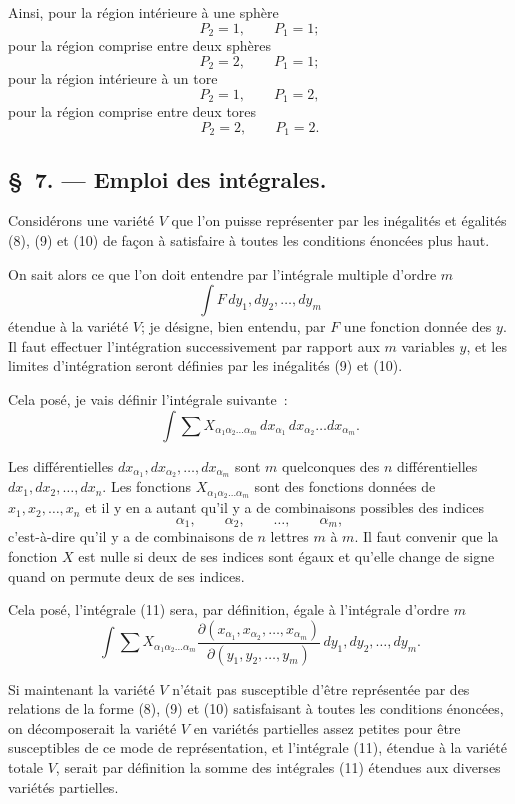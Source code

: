 \documentclass{article}
\begin{document}
Ainsi, pour la région intérieure à une sphère
\[
P_{2} = 1, \qquad P_{1} = 1;
\]
pour la région comprise entre deux sphères
\[
P_{2} = 2, \qquad P_{1} = 1;
\]
pour la région intérieure à un tore
\[
P_{2} = 1, \qquad P_{1} = 2,
\]
pour la région comprise entre deux tores
\[
P_{2} = 2, \qquad P_{1} = 2.
\]

\subsection*{\S~7. --- Emploi des intégrales.}

Considérons une variété $V$ que l'on puisse représenter par les inégalités et égalités (8), (9) et (10) de façon à satisfaire à toutes les conditions énoncées plus haut.

On sait alors ce que l'on doit entendre par l'intégrale multiple d'ordre $m$
\[
\int F\,dy_{1}, dy_{2}, \ldots, dy_{m}
\]
étendue à la variété $V$; je désigne, bien entendu, par $F$ une fonction donnée des $y$. Il faut effectuer l'intégration successivement par rapport aux $m$ variables $y$, et les limites d'intégration seront définies par les inégalités (9) et (10).

Cela posé, je vais définir l'intégrale suivante~:
\[
\int \sum X_{\alpha_{1}\alpha_{2}\ldots\alpha_{m}}\,dx_{\alpha_{1}}\,dx_{\alpha_{2}} \ldots dx_{\alpha_{m}}. \tag{11}
\]

Les différentielles $dx_{\alpha_{1}}, dx_{\alpha_{2}}, \ldots, dx_{\alpha_{m}}$ sont $m$ quelconques des $n$ différentielles $dx_{1}, dx_{2}, \ldots, dx_{n}$. Les fonctions $X_{\alpha_{1}\alpha_{2}\ldots\alpha_{m}}$ sont des fonctions données de $x_{1}, x_{2}, \ldots, x_{n}$ et il y en a autant qu'il y a de combinaisons possibles des indices
\[
\alpha_{1}, \qquad \alpha_{2}, \qquad \ldots, \qquad \alpha_{m},
\]
c'est-à-dire qu'il y a de combinaisons de $n$ lettres $m$ à $m$. Il faut convenir que la fonction $X$ est nulle si deux de ses indices sont égaux et qu'elle change de signe quand on permute deux de ses indices.

Cela posé, l'intégrale (11) sera, par définition, égale à l'intégrale d'ordre $m$
\[
\int \sum X_{\alpha_{1}\alpha_{2}\ldots\alpha_{m}} \frac{\partial(x_{\alpha_{1}}, x_{\alpha_{2}}, \ldots, x_{\alpha_{m}})}{\partial(y_{1}, y_{2}, \ldots, y_{m})}\,dy_{1}, dy_{2}, \ldots, dy_{m}.
\]

Si maintenant la variété $V$ n'était pas susceptible d'être représentée par des relations de la forme (8), (9) et (10) satisfaisant à toutes les conditions énoncées, on décomposerait la variété $V$ en variétés partielles assez petites pour être susceptibles de ce mode de représentation, et l'intégrale (11), étendue à la variété totale $V$, serait par définition la somme des intégrales (11) étendues aux diverses variétés partielles.
\end{document}
